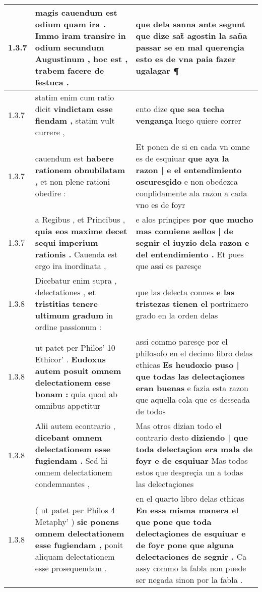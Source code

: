 \begin{tabular}{|p{1cm}|p{6.5cm}|p{6.5cm}|}
1.3.7 & magis cauendum est odium quam ira . \textbf{ Immo iram transire in odium secundum Augustinum , } hoc est , trabem facere de festuca . & que dela sanna ante segunt que dize \textbf{ sat̃ agostin la saña passar se en mal querençia } esto es de vna paia fazer ugalagar ¶ \\\hline
1.3.7 & statim enim cum ratio dicit \textbf{ vindictam esse fiendam , } statim vult currere , & ento dize \textbf{ que sea techa vengança } luego quiere correr \\\hline
1.3.7 & cauendum est \textbf{ habere rationem obnubilatam , } et non plene rationi obedire : & Et ponen de si en cada vn omne es de esquiuar \textbf{ que aya la razon | e el entendimiento oscuresçido } e non obedezca conplidamente ala razon a cada vno es de foyr \\\hline
1.3.7 & a Regibus , et Princibus , \textbf{ quia eos maxime decet sequi imperium rationis . } Cauenda est ergo ira inordinata , & e alos prinçipes \textbf{ por que mucho mas conuiene aellos | de segnir el iuyzio dela razon e del entendimiento . } Et pues que assi es paresçe \\\hline
1.3.8 & Dicebatur enim supra , delectationes , \textbf{ et tristitias tenere ultimum gradum } in ordine passionum : & que las delecta connes \textbf{ e las tristezas tienen el } postrimero grado en la orden delas \\\hline
1.3.8 & ut patet per Philos’ 10 Ethicor’ . \textbf{ Eudoxus autem posuit omnem delectationem esse bonam : } quia quod ab omnibus appetitur & assi commo paresçe por el philosofo en el decimo libro delas ethicas \textbf{ Es heudoxio puso | que todas las delectaçiones eran buenas } e fazia esta razon que aquella cola que es desseada de todos \\\hline
1.3.8 & Alii autem econtrario , \textbf{ dicebant omnem delectationem esse fugiendam . } Sed hi omnem delectationem condemnantes , & Mas otros dizian todo el contrario desto \textbf{ diziendo | que toda delectaçion era mala de foyr e de esquiuar } Mas todos estos que despreçia un a todas las delectaçiones \\\hline
1.3.8 & ( ut patet per Philos 4 Metaphy’ ) \textbf{ sic ponens omnem delectationem esse fugiendam , } ponit aliquam delectationem esse prosequendam . & en el quarto libro delas ethicas \textbf{ En essa misma manera el que pone que toda delectaçiones de esquiuar e de foyr pone que alguna delectaciones de segnir . } Ca assy commo la fabla non puede ser negada sinon por la fabla . \\\hline

\end{tabular}
